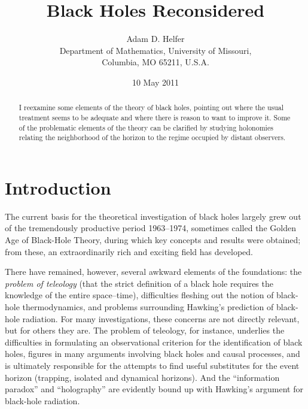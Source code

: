 \documentclass[12pt]{article}
\begin{document}
\title{Black Holes Reconsidered}

\author{Adam D. Helfer\\
  Department of Mathematics, University of Missouri, \\
  Columbia, MO 65211, U.S.A.\\
}

\date{10 May 2011}

\maketitle

\begin{abstract}
I reexamine some elements of the theory of black holes, pointing out where the usual treatment seems to be adequate and where there is reason to want to improve it.  Some of the problematic elements of the theory can be clarified by studying holonomies relating the neighborhood of the horizon to the regime occupied by distant observers.
\end{abstract}

\newpage

\section{Introduction}

The current basis for the theoretical investigation of black holes largely grew out of the tremendously productive period 1963--1974, sometimes called the Golden Age of Black-Hole Theory, during which key concepts and results were obtained; from these, an extraordinarily rich and exciting
field has developed.

There have remained, however, several awkward elements of the foundations:  the {\em problem of teleology} (that the strict definition of a  black hole requires the knowledge of the entire
 space--time), difficulties fleshing out the notion of black-hole thermodynamics, and problems surrounding Hawking's prediction of black-hole radiation.  For many investigations, these concerns are not directly relevant, but for others they are.  
The problem of teleology, for instance, underlies the difficulties in formulating an observational criterion for the identification of black holes, figures in many arguments involving black holes and causal processes, and is ultimately responsible for the
attempts to find useful substitutes for the event horizon (trapping, isolated and dynamical horizons).
And the ``information paradox'' and ``holography'' are evidently bound up with Hawking's argument for black-hole radiation. 
\end{document}
